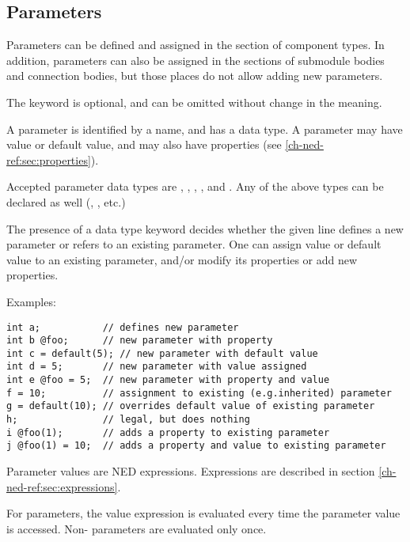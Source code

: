 \subsection{Parameters}
\label{ch-ned-ref:sec:parameters}

Parameters can be defined and assigned in the  section
of component types. In addition, parameters can also be assigned in the
 sections of submodule bodies and connection bodies,
but those places do not allow adding new parameters.

The  keyword is optional, and can be omitted
without change in the meaning.

A parameter is identified by a name, and has a data type. A parameter
may have value or default value, and may also have properties
(see \ref{ch-ned-ref:sec:properties}).

Accepted parameter data types are , ,
, , and . Any
of the above types can be declared  as well
(, , etc.)

The presence of a data type keyword decides whether the given line defines
a new parameter or refers to an existing parameter. One can assign value or
default value to an existing parameter, and/or modify its properties or add
new properties.

Examples:

\begin{verbatim}
int a;           // defines new parameter
int b @foo;      // new parameter with property
int c = default(5); // new parameter with default value
int d = 5;       // new parameter with value assigned
int e @foo = 5;  // new parameter with property and value
f = 10;          // assignment to existing (e.g.inherited) parameter
g = default(10); // overrides default value of existing parameter
h;               // legal, but does nothing
i @foo(1);       // adds a property to existing parameter
j @foo(1) = 10;  // adds a property and value to existing parameter
\end{verbatim}

Parameter values are NED expressions. Expressions are described in section
\ref{ch-ned-ref:sec:expressions}.

For  parameters, the value expression is evaluated every
time the parameter value is accessed. Non- parameters
are evaluated only once.


